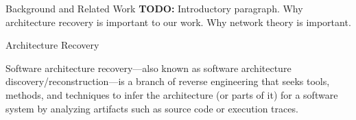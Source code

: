 \documentclass[11pt,twocolumn,a4paper,english]{article}
\newcommand{\TODO}{\textbf{TODO:} }
\begin{document}

\begin{section}{Background and Related Work} \label{sec:back}
	\TODO Introductory paragraph. Why architecture recovery is important to our work. Why network theory is important.
	

\begin{subsection}{Architecture Recovery}
	
	Software architecture recovery---also known as software architecture discovery/reconstruction---is a branch of reverse engineering that seeks tools, methods, and techniques to infer the architecture (or parts of it) for a software system by analyzing artifacts such as source code or execution traces.
%
	

\end{subsection}
\end{section}
\end{document}
